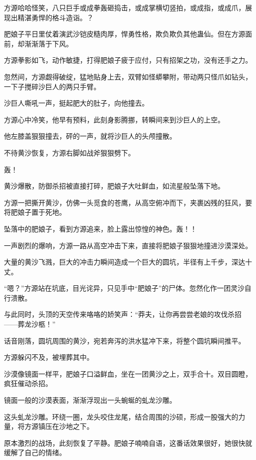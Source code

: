 
\begin{this_body}



方源哈哈怪笑，八只巨手或成拳轰砸捣击，或成掌横切竖拍，或成指，或成爪，展现出精湛勇悍的格斗造诣。？

肥娘子平日里仗着演武沙铠皮糙肉厚，悍勇性格，欺负欺负其他蛊仙。但在方源面前，却渐渐落于下风。

方源拳影如飞，动作敏捷，打得肥娘子疲于应付，只有招架之功，没有还手之力。

忽然间，方源觑得破绽，猛地贴身上去，双臂如怪蟒攀附，带动两只怪爪如钻头，一下子搅碎沙巨人的两只手臂。

沙巨人嘶吼一声，挺起肥大的肚子，向他撞去。

方源心中冷笑，他早有预料，此刻身影腾挪，转瞬间来到沙巨人的上空。

他左膝盖狠狠撞去，砰的一声，就将沙巨人的头颅撞散。

不待黄沙恢复，方源右脚如战斧狠狠劈下。

轰！

黄沙爆散，防御杀招被直接打碎，肥娘子大吐鲜血，如流星般坠落下地。

方源一把撕开黄沙，仿佛一头觅食的苍鹰，从高空俯冲而下，夹裹凶残的狂风，要将肥娘子置于死地。

坠落中的肥娘子，看到方源追来，脸上露出惊惶的神色。轰！！

一声剧烈的爆响，方源一路从高空冲击下来，直接将肥娘子狠狠地撞进沙漠深处。

大量的黄沙飞溅，巨大的冲击力瞬间造成一个巨大的圆坑，半径有上千步，深达十丈。

“嗯？”方源站在坑底，目光诧异，只见手中“肥娘子”的尸体。忽然化作一团灵沙自行溃散。

与此同时，头顶的天空传来咯咯的娇笑声：“莽夫，让你再尝尝老娘的攻伐杀招——葬龙沙柩！”

话音刚落，圆坑周围的黄沙，宛若奔泻的洪水猛冲下来，将整个圆坑瞬间推平。

方源躲闪不及，被埋葬其中。

沙漠像镜面一样平，肥娘子口溢鲜血，坐在一团黄沙之上，双手合十。双目圆瞪，疯狂催动杀招。

镜面一般的沙漠表面，渐渐浮现出一头蜿蜒的虬龙沙雕。

这头虬龙沙雕。环绕一圈，龙头咬住龙尾，结合周围的沙硕，形成一股强大的力量，将方源镇压在沙地之下。

原本激烈的战场，此刻恢复了平静。肥娘子喃喃自语，这番话效果很好，她很快就缓解了自己的情绪。


\end{this_body}
